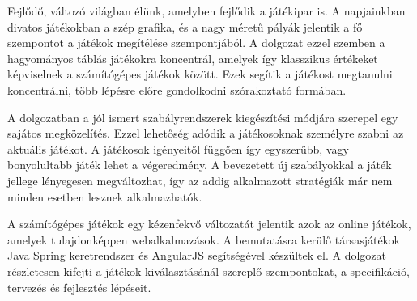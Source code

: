 
Fejlődő, változó világban élünk, amelyben fejlődik a játékipar is.
A napjainkban divatos játékokban a szép grafika, és a nagy méretű pályák jelentik a fő szempontot a játékok megítélése szempontjából. A dolgozat ezzel szemben a hagyományos táblás játékokra koncentrál, amelyek így klasszikus értékeket képviselnek a számítógépes játékok között. Ezek segítik a játékost megtanulni koncentrálni, több lépésre előre gondolkodni szórakoztató formában.

A dolgozatban a jól ismert szabályrendszerek kiegészítési módjára szerepel egy sajátos megközelítés. Ezzel lehetőség adódik a játékosoknak személyre szabni az aktuális játékot. A játékosok igényeitől függően így egyszerűbb, vagy bonyolultabb játék lehet a végeredmény. A bevezetett új szabályokkal a játék jellege lényegesen megváltozhat, így az addig alkalmazott stratégiák már nem minden esetben lesznek alkalmazhatók.

A számítógépes játékok egy kézenfekvő változatát jelentik azok az online játékok, amelyek tulajdonképpen webalkalmazások. A bemutatásra kerülő társasjátékok Java Spring keretrendszer és AngularJS segítségével készültek el. A dolgozat részletesen kifejti a játékok kiválasztásánál szereplő szempontokat, a specifikáció, tervezés és fejlesztés lépéseit.